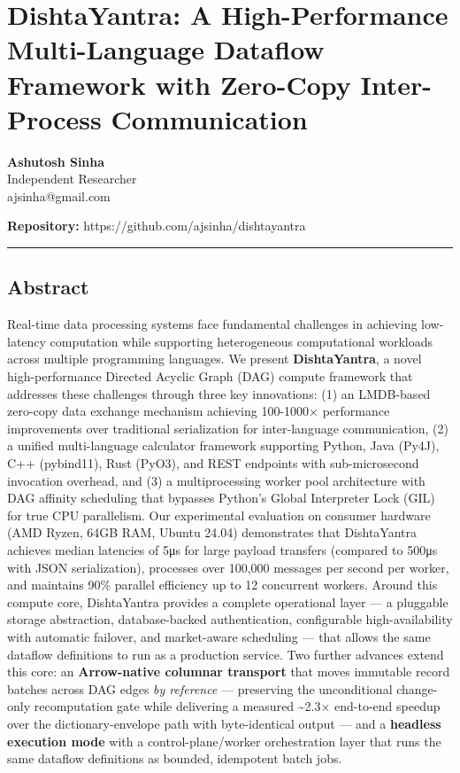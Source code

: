 \documentclass[
]{article}
\author{}
\date{}
\begin{document}
\hypertarget{dishtayantra-a-high-performance-multi-language-dataflow-framework-with-zero-copy-inter-process-communication}{%
\section{DishtaYantra: A High-Performance Multi-Language Dataflow
Framework with Zero-Copy Inter-Process
Communication}\label{dishtayantra-a-high-performance-multi-language-dataflow-framework-with-zero-copy-inter-process-communication}}

\textbf{Ashutosh Sinha}\\
Independent Researcher\\
ajsinha@gmail.com

\textbf{Repository:} https://github.com/ajsinha/dishtayantra

\begin{center}\rule{0.5\linewidth}{0.5pt}\end{center}

\hypertarget{abstract}{%
\subsection{Abstract}\label{abstract}}

Real-time data processing systems face fundamental challenges in
achieving low-latency computation while supporting heterogeneous
computational workloads across multiple programming languages. We
present \textbf{DishtaYantra}, a novel high-performance Directed Acyclic
Graph (DAG) compute framework that addresses these challenges through
three key innovations: (1) an LMDB-based zero-copy data exchange
mechanism achieving 100-1000× performance improvements over traditional
serialization for inter-language communication, (2) a unified
multi-language calculator framework supporting Python, Java (Py4J), C++
(pybind11), Rust (PyO3), and REST endpoints with sub-microsecond
invocation overhead, and (3) a multiprocessing worker pool architecture
with DAG affinity scheduling that bypasses Python's Global Interpreter
Lock (GIL) for true CPU parallelism. Our experimental evaluation on
consumer hardware (AMD Ryzen, 64GB RAM, Ubuntu 24.04) demonstrates that
DishtaYantra achieves median latencies of 5μs for large payload
transfers (compared to 500μs with JSON serialization), processes over
100,000 messages per second per worker, and maintains 90\% parallel
efficiency up to 12 concurrent workers. Around this compute core,
DishtaYantra provides a complete operational layer --- a pluggable
storage abstraction, database-backed authentication, configurable
high-availability with automatic failover, and market-aware scheduling
--- that allows the same dataflow definitions to run as a production
service. Two further advances extend this core: an \textbf{Arrow-native
columnar transport} that moves immutable record batches across DAG edges
\emph{by reference} --- preserving the unconditional change-only
recomputation gate while delivering a measured \textasciitilde2.3×
end-to-end speedup over the dictionary-envelope path with byte-identical
output --- and a \textbf{headless execution mode} with a
control-plane/worker orchestration layer that runs the same dataflow
definitions as bounded, idempotent batch jobs.
\end{document}
